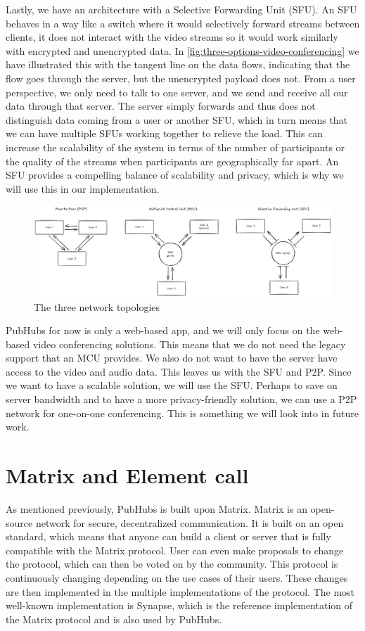 \documentclass{report}
\begin{document}
Lastly, we have an architecture with a Selective Forwarding Unit (SFU). An SFU behaves in a way like a switch where it
would selectively forward streams between clients, it does not interact with the video streams so it would work
similarly with encrypted and unencrypted data.  In \autoref{fig:three-options-video-conferencing} we have
illustrated this with the tangent line on the data flows, indicating that the flow goes through the server, but
the unencrypted payload does not. From a user perspective, we only need to talk to one server, and we
send and receive all our data through that server.  The server simply forwards and thus does not distinguish data
coming from a user or another SFU, which in turn means that we can have multiple SFUs working together to relieve
the load. This can increase the scalability of the system in terms of the number of participants or the quality of the streams when
participants are geographically far apart. An SFU provides a compelling balance of scalability and privacy, which is
why we will use this in our implementation.

\begin{figure}[!hbt]
\centering
\includegraphics[width=\textwidth]{img/thesisDPD}
\caption{The three network topologies}
\label{fig:three-options-video-conferencing}
\end{figure}

PubHubs for now is only a web-based app, and we will only focus on the web-based video conferencing solutions. This means
that we do not need the legacy support that an MCU provides. We also do not want to have the server have access to the
video and audio data. This leaves us with the SFU and P2P. Since we want to have a scalable solution, we will use
the SFU.
Perhaps to save on server bandwidth and to have a more privacy-friendly solution, we can use a P2P network for one-on-one
conferencing. This is something we will look into in future work.

\section{Matrix and Element call}\label{sec:matrix}
As mentioned previously, PubHubs is built upon Matrix. Matrix is an open-source network for secure, decentralized
communication. It is built on an open standard, which means that anyone can build a client or server that is fully
compatible with the Matrix protocol. User can even make proposals to change the protocol, which can then be voted on
by the community. This protocol is continuously changing depending on the use cases of their users. These changes
are then implemented in the multiple implementations of the protocol. The most well-known implementation is Synapse,
which is the reference implementation of the Matrix protocol and is also used by PubHubs.
\end{document}
